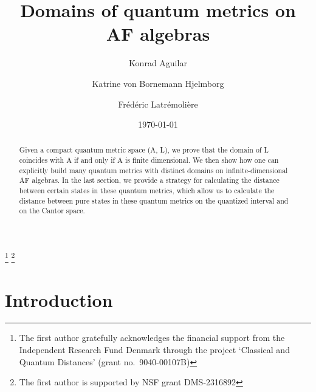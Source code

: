 \documentclass[]{amsart}
\theoremstyle{plain}
\theoremstyle{definition}
\theoremstyle{remark}
\numberwithin{equation}{section}
\begin{document}
\title[Domains of quantum metrics on AF algebras]{Domains of quantum metrics on AF algebras}
\author{Konrad Aguilar}
\address{Department of Mathematics and Statistics, Pomona College, Claremont, CA 91711}
\thanks{The first author gratefully acknowledges the financial support  from the Independent Research Fund Denmark  through the project `Classical and Quantum Distances' (grant no.~9040-00107B)}
\thanks{The first author is supported by NSF grant DMS-2316892}

  
\author{Katrine von Bornemann Hjelmborg}
\urladdr{}
\address{Department of Mathematics and Computer Science (IMADA) \\ University of Southern Denmark \\  Campusvej 55, DK-5230 Odense M, Denmark}

\author{Fr\'ed\'eric Latr\'emoli\`ere}
\address{Department of Mathematics, University of Denver, 2199 S. University Blvd, Denver
CO 80208}

\date{\today}



\begin{abstract}
Given a compact quantum metric space (A, L),  we prove that the domain of  L  coincides with A if and only if A is finite dimensional.   We then show how one can explicitly build many   quantum metrics with distinct domains on infinite-dimensional AF algebras. In the last section, we provide a  strategy for calculating the distance between certain states in these quantum metrics, which allow us to calculate the distance between pure states in these quantum metrics on the quantized interval  and on the Cantor space.
\end{abstract}
\maketitle

\tableofcontents

\section{Introduction}
\end{document}
